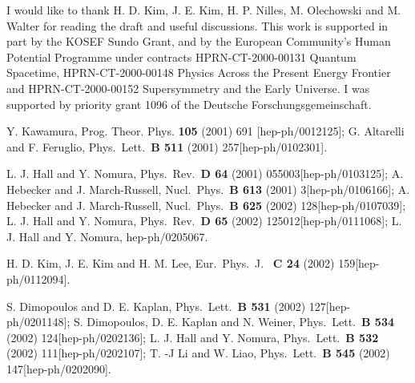 \documentclass[a4paper,12pt]{article}
\begin{document}
\vskip 1cm 
\vskip 0.5cm

\noindent I would like to thank H. D. Kim, J. E. Kim, H. P. Nilles, 
M. Olechowski and M. Walter for reading the draft and useful discussions.
This work is supported in part by the KOSEF Sundo Grant, and by the 
European Community's Human Potential Programme under contracts 
HPRN-CT-2000-00131 Quantum Spacetime, HPRN-CT-2000-00148 Physics Across the
Present Energy Frontier and HPRN-CT-2000-00152 Supersymmetry and the Early
Universe. I was supported by priority grant 1096 of the Deutsche 
Forschungsgemeinschaft.


%
%
\begin{thebibliography}{99}

\def\apj#1#2#3{Astrophys.\ J.\ {\bf #1} (#2) #3}
\def\ijmp#1#2#3{Int.\ J.\ Mod.\ Phys.\ {\bf #1} (#2) #3}
\def\mpl#1#2#3{Mod.\ Phys.\ Lett.\ {\bf #1} (#2) #3}
\def\nat#1#2#3{Nature\ {\bf #1} (#2) #3}
\def\npb#1#2#3{Nucl.\ Phys.\ {\bf B #1} (#2) #3}
\def\plb#1#2#3{Phys.\ Lett.\ {\bf B #1} (#2) #3}
\def\prd#1#2#3{Phys.\ Rev.\ {\bf D #1} (#2) #3}
\def\prl#1#2#3{Phys.\ Rev.\ Lett.\ {\bf #1} (#2) #3}
\def\prt#1#2#3{Phys.\ Rep.\ {\bf #1} (#2) #3}
\def\sjnp#1#2#3{Sov.\ J.\ Nucl.\ Phys.\ {\bf #1} (#2) #3}
\def\zp#1#2#3{Z.\ Phys.\ {\bf C #1} (#2) #3}
\def\jhep#1#2#3{JHEP \ {\bf #1} (#2) #3}
\def\epjc#1#2#3{Eur.\ Phys.\ J. \ {\bf C #1} (#2) #3}


 Y. Kawamura, Prog. Theor. Phys. {\bf 105} (2001) 691
[hep-ph/0012125];
G. Altarelli and F. Feruglio, \plb{511}{2001}{257}[hep-ph/0102301].

L. J. Hall and Y. Nomura, \prd{64}{2001}{055003}[hep-ph/0103125];
A. Hebecker and J. March-Russell, \npb{613}{2001}{3}[hep-ph/0106166];
A. Hebecker and J. March-Russell, \npb{625}{2002}{128}[hep-ph/0107039];
L. J. Hall and Y. Nomura, \prd{65}{2002}{125012}[hep-ph/0111068];
L. J. Hall and Y. Nomura, hep-ph/0205067.   

H. D. Kim, J. E. Kim and H. M. Lee, \epjc{24}{2002}{159}[hep-ph/0112094].

S. Dimopoulos and D. E. Kaplan, \plb{531}{2002}{127}[hep-ph/0201148];
S. Dimopoulos, D. E. Kaplan and N. Weiner, 
\plb{534}{2002}{124}[hep-ph/0202136];
L. J. Hall and Y. Nomura, \plb{532}{2002}{111}[hep-ph/0202107];
T. -J Li and W. Liao, \plb{545}{2002}{147}[hep-ph/0202090].


\end{thebibliography}
\end{document}
